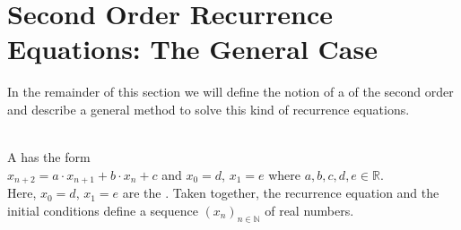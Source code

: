 \section{Second Order Recurrence Equations: The General Case}
In the remainder of this section we will define the notion of a 
of the second order and describe a general method to solve this kind of recurrence equations.

\begin{Definition} \hspace*{\fill} \\
  A 
  has the form
  \\[0.2cm]
  \hspace*{1.3cm}
  $x_{n+2} = a \cdot x_{n+1} + b \cdot x_n + c$ \quad and \quad $x_0 = d$, $x_1 = e$
  \quad where $a, b, c, d, e \in \mathbb{R}$.
  \\[0.2cm]
  Here, $x_0 = d$, $x_1 = e$ are the .  Taken together, the recurrence
  equation and the initial conditions define a sequence $(x_n)_{n\in\mathbb{N}}$ of real numbers.  \eox
\end{Definition}

